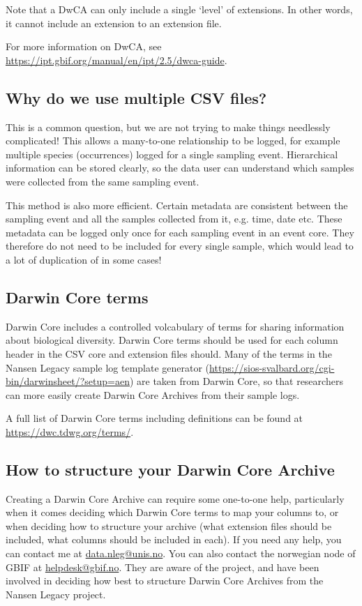 \documentclass[a4paper,english, 11pt]{article}
\makeatletter
\newcommand{\emailme}{\href{mailto:data.nleg@unis.no}{data.nleg@unis.no}}
\makeatother
\begin{document}
Note that a DwCA can only include a single `level' of extensions. In other words, it cannot include an extension to an extension file.

For more information on DwCA, see \url{https://ipt.gbif.org/manual/en/ipt/2.5/dwca-guide}.

\subsection{Why do we use multiple CSV files?}
\label{ss:multiplefiles}

This is a common question, but we are not trying to make things needlessly complicated! This allows a many-to-one relationship to be logged, for example multiple species (occurrences) logged for a single sampling event. Hierarchical information can be stored clearly, so the data user can understand which samples were collected from the same sampling event.

This method is also more efficient. Certain metadata are consistent between the sampling event and all the samples collected from it, e.g. time, date etc. These metadata can be logged only once for each sampling event in an event core. They therefore do not need to be included for every single sample, which would lead to a lot of duplication of in some cases!

\subsection{Darwin Core terms}
\label{ss:dwcterms}

Darwin Core includes a controlled volcabulary of terms for sharing information about biological diversity. Darwin Core terms should be used for each column header in the CSV core and extension files should. Many of the terms in the Nansen Legacy sample log template generator (\url{https://sios-svalbard.org/cgi-bin/darwinsheet/?setup=aen}) are taken from Darwin Core, so that researchers can more easily create Darwin Core Archives from their sample logs.

A full list of Darwin Core terms including definitions can be found at \url{https://dwc.tdwg.org/terms/}.

\subsection{How to structure your Darwin Core Archive}
\label{ss:structuredwca}

Creating a Darwin Core Archive can require some one-to-one help, particularly when it comes deciding which Darwin Core terms to map your columns to, or when deciding how to structure your archive (what extension files should be included, what columns should be included in each). If you need any help, you can contact me at \emailme. You can also contact the norwegian node of GBIF at \href{mailto:helpdesk@gbif.no}{helpdesk@gbif.no}. They are aware of the project, and have been involved in deciding how best to structure Darwin Core Archives from the Nansen Legacy project.
\end{document}
